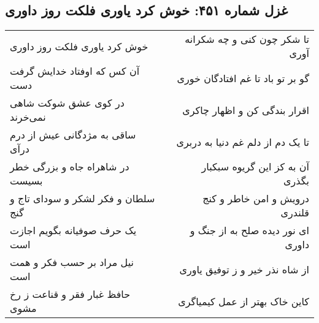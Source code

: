 \begin{center}
\section*{غزل شماره ۴۵۱: خوش کرد یاوری فلکت روز داوری}
\label{sec:sh451}
\begin{longtable}{l p{0.5cm} r}
خوش کرد یاوری فلکت روز داوری
&&
تا شکر چون کنی و چه شکرانه آوری
\\
آن کس که اوفتاد خدایش گرفت دست
&&
گو بر تو باد تا غم افتادگان خوری
\\
در کوی عشق شوکت شاهی نمی‌خرند
&&
اقرار بندگی کن و اظهار چاکری
\\
ساقی به مژدگانی عیش از درم درآی
&&
تا یک دم از دلم غم دنیا به دربری
\\
در شاهراه جاه و بزرگی خطر بسیست
&&
آن به کز این گریوه سبکبار بگذری
\\
سلطان و فکر لشکر و سودای تاج و گنج
&&
درویش و امن خاطر و کنج قلندری
\\
یک حرف صوفیانه بگویم اجازت است
&&
ای نور دیده صلح به از جنگ و داوری
\\
نیل مراد بر حسب فکر و همت است
&&
از شاه نذر خیر و ز توفیق یاوری
\\
حافظ غبار فقر و قناعت ز رخ مشوی
&&
کاین خاک بهتر از عمل کیمیاگری
\\
\end{longtable}
\end{center}
